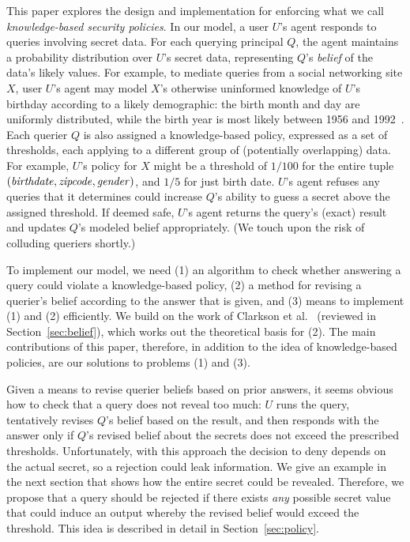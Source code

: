 This paper explores the design and implementation for enforcing what we
call \emph{knowledge-based security policies}.  In our model, a user $U$'s agent responds to
queries involving secret data.  For each querying principal $Q$, the agent
maintains a probability distribution over $U$'s secret data,
representing $Q$'s \emph{belief} of the data's likely values.  For
example, to mediate queries from a social networking site $X$,
user $U$'s agent may model $X$'s otherwise
uninformed knowledge of $U$'s birthday according to a likely
demographic: the birth month and day are uniformly distributed, while
the birth year is most likely between 1956 and
1992~\cite{facebook-demographics}.  Each querier $Q$ is also assigned a
knowledge-based policy, expressed as a set of thresholds, each
applying to a different group of (potentially overlapping) data.  For
example, $U$'s policy for $X$ might be a threshold of $1/100$ for
the entire tuple $(\mathit{birthdate},\mathit{zipcode},\mathit{gender})$, and
$1/5$ for just birth date.  $U$'s agent refuses any
queries that it determines could increase $Q$'s ability to guess a
secret above the assigned threshold.  If deemed safe, $U$'s agent returns the
query's (exact) result and updates $Q$'s modeled belief appropriately.
(We touch upon the risk of colluding queriers shortly.)

To implement our model, we need (1) an algorithm to check whether
answering a query could violate a knowledge-based policy, (2) a method
for revising a querier's belief according to the answer that is given,
and (3) means to implement (1) and (2) efficiently.  We build on the
work of Clarkson et al.~\cite{clarkson09quantifying} (reviewed in
Section~\ref{sec:belief}), which works out the theoretical basis for
(2).  The main contributions of this
paper, therefore, in addition to the idea of knowledge-based policies,
are our solutions to problems (1) and (3). 

Given a means to revise querier beliefs based on prior answers,
it seems obvious how to check that a query does not reveal too much: $U$ runs the query, tentatively
revises $Q$'s belief based on the result, and then responds with the
answer only if $Q$'s revised
belief about the secrets does not exceed the prescribed thresholds.
Unfortunately, with this approach the decision to deny depends on
the actual secret, so a rejection could leak information.  We give an
example in the next section that shows how the entire secret could be
revealed.  Therefore, we propose that a
query should be rejected if there exists \emph{any} possible secret
value that could induce an output whereby the revised belief would exceed the
threshold.  This idea is described in detail in Section~\ref{sec:policy}.

